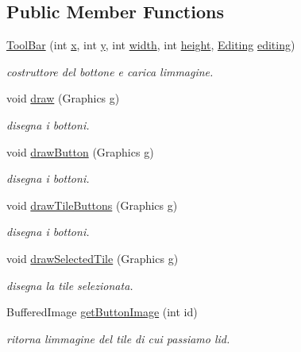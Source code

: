 \subsection*{Public Member Functions}
\begin{DoxyCompactItemize}
\item 
\hyperlink{classui_1_1_tool_bar_a43193f5c8a197b7b1ccfc248dec1db9b}{Tool\+Bar} (int \hyperlink{classui_1_1_bar_a6150e0515f7202e2fb518f7206ed97dc}{x}, int \hyperlink{classui_1_1_bar_a0a2f84ed7838f07779ae24c5a9086d33}{y}, int \hyperlink{classui_1_1_bar_a2474a5474cbff19523a51eb1de01cda4}{width}, int \hyperlink{classui_1_1_bar_ad12fc34ce789bce6c8a05d8a17138534}{height}, \hyperlink{classscenes_1_1_editing}{Editing} \hyperlink{classui_1_1_tool_bar_a38f9dcf960197192269b03c788903b3e}{editing})
\begin{DoxyCompactList}\small\item\em costruttore del bottone e carica l\textquotesingle{}immagine. \end{DoxyCompactList}\item 
void \hyperlink{classui_1_1_tool_bar_a72fe1ffca978e99fd16994a10e7f8051}{draw} (Graphics g)
\begin{DoxyCompactList}\small\item\em disegna i bottoni. \end{DoxyCompactList}\item 
void \hyperlink{classui_1_1_tool_bar_a65768678909bc0512c6cb9780709ad38}{draw\+Button} (Graphics g)
\begin{DoxyCompactList}\small\item\em disegna i bottoni. \end{DoxyCompactList}\item 
void \hyperlink{classui_1_1_tool_bar_a55c79e1185fb66ae98edacc2c7d5c302}{draw\+Tile\+Buttons} (Graphics g)
\begin{DoxyCompactList}\small\item\em disegna i bottoni. \end{DoxyCompactList}\item 
void \hyperlink{classui_1_1_tool_bar_aa0f35d91a41dfb53af7bdd7d4a76916f}{draw\+Selected\+Tile} (Graphics g)
\begin{DoxyCompactList}\small\item\em disegna la tile selezionata. \end{DoxyCompactList}\item 
Buffered\+Image \hyperlink{classui_1_1_tool_bar_abe2e2af5c0d57248464e8b607c41a36f}{get\+Button\+Image} (int id)
\begin{DoxyCompactList}\small\item\em ritorna l\textquotesingle{}immagine del tile di cui passiamo l\textquotesingle{}id. \end{DoxyCompactList}\item 

\end{DoxyCompactItemize}
